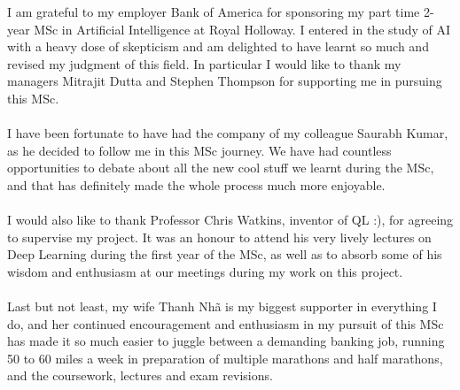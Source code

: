 \documentclass[
11pt, %
english, %
singlespacing, %
headsepline, %
]{MastersDoctoralThesis} %
\begin{document}
\begin{acknowledgements}
\addchaptertocentry{\acknowledgementname} %
I am grateful to my employer Bank of America for sponsoring my part time 2-year MSc in Artificial Intelligence at Royal Holloway. I entered in the study of AI with a heavy dose of skepticism and am delighted to have learnt so much and revised my judgment of this field.
In particular I would like to thank my managers Mitrajit Dutta and Stephen Thompson for supporting me in pursuing this MSc.
\\
\\
I have been fortunate to have had the company of my colleague Saurabh Kumar, as he decided to follow me in this MSc journey. We have had countless opportunities to debate about all the new cool stuff we learnt during the MSc, and that has definitely made the whole process much more enjoyable.
\\
\\
I would also like to thank Professor Chris Watkins, inventor of QL :), for agreeing to supervise my project. It was an honour to attend his very lively lectures on Deep Learning during the first year of the MSc, as well as to absorb some of his wisdom and enthusiasm at our meetings during my work on this project.
\\
\\
Last but not least, my wife Thanh Nh\~a is my biggest supporter in everything I do, and her continued encouragement and enthusiasm in my pursuit of this MSc has made it so much easier to juggle between a demanding banking job, running 50 to 60 miles a week in preparation of multiple marathons and half marathons, and the coursework, lectures and exam revisions.
\end{acknowledgements}




\end{document}
